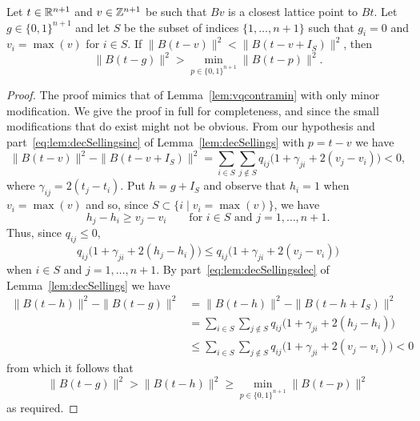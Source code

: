 \documentclass[final,leqno]{siamltex}
\begin{document}
\begin{lemma}\label{lem:vqcontramax}
Let $t \in {\mathbb R}^{n+1}$ and $v \in {\mathbb Z}^{n+1}$ be such that $Bv$ is a closest lattice point to $Bt$.  Let $g \in \{0,1\}^{n+1}$ and let $S$ be the subset of indices $\{1,\dots,n+1\}$ such that $g_i=0$ and $v_i = \max(v)$ for $i \in S$.  If $\|B(t-v)\|^2 < \|B(t-v+I_S)\|^2$, then
\[
\|B(t - g)\|^2 > \min_{p \in \{0,1\}^{n+1}}\|B(t - p)\|^2.
\]
\end{lemma}
\begin{proof}
The proof mimics that of Lemma~\ref{lem:vqcontramin} with only minor modification.  We give the proof in full for completeness, and since the small modifications that do exist might not be obvious. From our hypothesis and part~\ref{eq:lem:decSellingsinc} of Lemma~\ref{lem:decSellings} with $p = t-v$ we have
\[
\|B(t-v)\|^2 - \|B(t-v+I_S)\|^2 = \sum_{i \in S}\sum_{j \notin S}q_{ij}\big(1 + \gamma_{ji} + 2(v_j - v_i)\big) < 0,
\]
where $\gamma_{ij} = 2(t_j - t_i)$.  Put $h = g + I_S$ and observe that $h_i = 1$ when $v_i = \max(v)$ and so, since $S \subset \{i \mid v_i = \max(v) \}$, we have
\[
h_j - h_i \geq v_j - v_i \qquad \text{for $i \in S$ and $j=1,\dots,n+1$.}
\]
Thus, since $q_{ij} \leq 0$,
\[
q_{ij}\big(1 + \gamma_{ji} + 2(h_j - h_i)\big) \leq q_{ij}\big(1 + \gamma_{ji} + 2(v_j - v_i)\big)
\]
when $i \in S$ and $j =1,\dots,n+1$.  By part~\ref{eq:lem:decSellingsdec} of Lemma~\ref{lem:decSellings} we have
\begin{align*}
\|B(t-h)\|^2 - \|B(t-g)\|^2 &= \|B(t-h)\|^2 - \|B(t-h+I_S)\|^2 \\
&= \sum_{i \in S}\sum_{j \notin S}q_{ij}\big(1 + \gamma_{ji} + 2(h_j - h_i)\big) \\
&\leq \sum_{i \in S}\sum_{j \notin S}q_{ij}\big(1 + \gamma_{ji} + 2(v_j - v_i)\big) < 0
\end{align*}
from which it follows that
\[
\|B(t-g)\|^2 > \|B(t-h)\|^2 \geq \min_{p \in \{0,1\}^{n+1}}\|B(t  - p)\|^2
\]
as required.
\end{proof}

\end{document}

